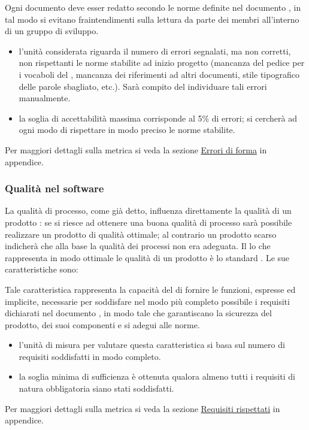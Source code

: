 \documentclass[a4paper, titlepage]{article}
\begin{document}
Ogni documento deve esser redatto secondo le norme definite nel documento , in tal modo si evitano fraintendimenti sulla lettura da parte dei membri all'interno di un gruppo di sviluppo.
\begin{itemize}
\item {} l'unità considerata riguarda il numero di errori  segnalati, ma non corretti, non rispettanti le norme stabilite ad inizio progetto (mancanza del pedice per i vocaboli del , mancanza dei riferimenti ad altri documenti, stile tipografico delle parole sbagliato, etc.). Sarà compito del  individuare tali errori manualmente.
\item {} la soglia di accettabilità massima corrisponde al 5\% di errori; si cercherà ad ogni modo di rispettare in modo preciso le norme stabilite.
\end{itemize}
Per maggiori dettagli sulla metrica si veda la sezione \hyperref[par:errfor]{Errori di forma} in appendice.

\subsubsection{Qualità nel software}
La qualità di processo, come già detto, influenza direttamente la qualità di un prodotto : se si riesce ad ottenere una buona qualità di processo sarà possibile realizzare un prodotto di qualità ottimale; al contrario un prodotto scarso indicherà che alla base la qualità dei processi non era adeguata.
\newline Il lo che rappresenta in modo ottimale le qualità di un prodotto  è lo standard .
\newline Le sue caratteristiche sono:

Tale caratteristica rappresenta la capacità del  di fornire le funzioni, espresse ed implicite, necessarie per soddisfare nel modo più completo possibile i requisiti dichiarati nel documento \ARdoc, in modo tale che garantiscano la sicurezza del prodotto, dei suoi componenti e si adegui alle norme.
\begin{itemize}
\item {} l'unità di misura per valutare questa caratteristica si basa sul numero di requisiti soddisfatti in modo completo.
\item {} la soglia minima di sufficienza è ottenuta qualora almeno tutti i requisiti di natura obbligatoria siano stati soddisfatti.
\end{itemize}
Per maggiori dettagli sulla metrica si veda la sezione \hyperref[par:req]{Requisiti rispettati} in appendice.
\end{document}
